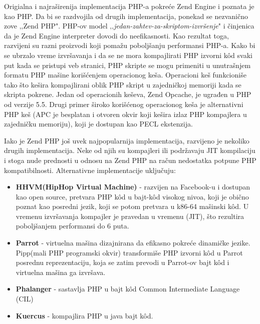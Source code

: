 \documentclass[a4paper]{article}
\begin{document}
{Origialna i najraširenija implementacija PHP-a pokreće Zend Engine i poznata je kao PHP. Da bi se razdvojila od drugih implementacija, ponekad se nezvanično zove ‚‚Zend PHP". PHP-ov model ‚‚\textit{jedan-zahtev-za-skriptom-izvršenje}" i činjenica da je Zend Engine interpreter dovodi do neefikasnosti. Kao rezultat toga, razvijeni su razni proizvodi koji pomažu poboljšanju performansi PHP-a. Kako bi se ubrzalo vreme izvršavanja i da se ne mora kompajlirati PHP izvorni k\^{o}d svaki put kada se pristupi veb stranici, PHP skripte se mogu primeniti u unutrašnjem formatu PHP mašine korišćenjem operacionog keša. Operacioni keš funkcioniše tako što kešira kompajlirani oblik PHP skript u zajedničkoj memoriji kada se skripta pokrene. Jedan od operacionih keševa, Zend Opcache\cite{zend}, je ugrađen u PHP od verzije 5.5. Drugi primer široko korišćenog operacionog keša je alternativni PHP keš (APC je besplatan i otvoren okvir koji kešira izlaz PHP kompajlera u zajedničku memoriju)\cite{php}, koji je dostupan kao PECL ekstenzija.

Iako je Zend PHP još uvek najpopularnija implementacija, razvijeno je nekoliko drugih implementacija. Neke od njih su kompajleri ili podržavaju JIT\cite{jit} kompilaciju i stoga nude prednosti u odnosu na Zend PHP na račun nedostatka potpune PHP kompatibilnosti. Alternativne implementacije uključuju:
\begin{itemize}
\item \textbf{HHVM(HipHop Virtual Machine)}\cite{hhvm} - razvijen na Facebook-u i dostupan kao open source, pretvara PHP k\^{o}d  u bajt-k\^{o}d visokog nivoa, koji je obično poznat kao posredni jezik, koji se potom pretvara u k86-64 mašinski k\^{o}d. U vremenu izvršavanja kompajler je pravedan u vremenu (JIT), što rezultira poboljšanjem performansi do 6 puta.
\item \textbf{Parrot}\cite{parrot} - virtuelna mašina dizajnirana da efikasno pokreće dinamičke jezike. Pipp(mali PHP programski okvir) transformiše PHP izvorni k\^{o}d u Parrot posrednu reprezentaciju, koja se zatim prevodi u Parrot-ov bajt k\^{o}d i virtuelna mašina ga izvršava.
\item \textbf{Phalanger} - sastavlja PHP u bajt k\^{o}d Common Intermediate Language (CIL)
\item \textbf{Kuercus} - kompajlira PHP u java bajt k\^{o}d.
\end{itemize}


}
\end{document}
